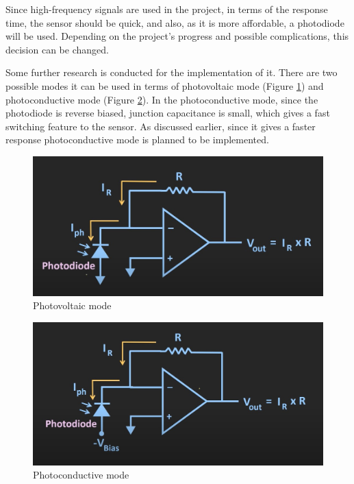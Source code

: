 \documentclass[a4paper,10pt]{IEEEtran}
\begin{document}
Since high-frequency signals are used in the project, in terms of the response time, the sensor should be quick, and also, as it is more affordable, a photodiode will be used. Depending on the project's progress and possible complications, this decision can be changed. 

Some further research is conducted for the implementation of it. There are two possible modes it can be used in terms of photovoltaic mode (Figure \ref{photovoltaic}) and photoconductive mode (Figure \ref{photoconductive}). In the photoconductive mode, since the photodiode is reverse biased, junction capacitance is small, which gives a fast switching feature to the sensor. As discussed earlier, since it gives a faster response photoconductive mode is planned to be implemented.

\begin{figure}[htbp!]
    \centering
    \includegraphics[width = 0.5\linewidth]{Photovoltaic.jpg}
    \caption{Photovoltaic mode}
    \label{photovoltaic}
    \end{figure} 

\begin{figure}[htbp!]
    \centering
    \includegraphics[width = 0.5\linewidth]{Photoconductive.jpg}
    \caption{Photoconductive mode}
    \label{photoconductive}
\end{figure} 
\vspace{-0.5cm}
\end{document}
